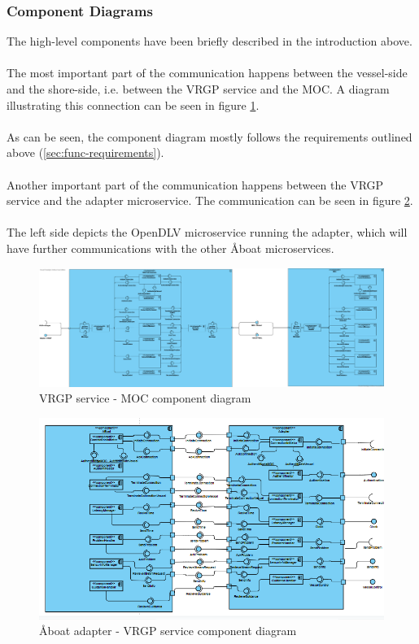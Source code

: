 \subsubsection{Component Diagrams}

The high-level components have been briefly described in the introduction above.
\\\\
The most important part of the communication happens between the vessel-side and the shore-side, i.e. between the VRGP service and the MOC. A diagram illustrating this connection can be seen in figure \ref{fig:vrgp-moc-component-diagram}.
\\\\
As can be seen, the component diagram mostly follows the requirements outlined above (\ref{sec:func-requirements}).
\\\\
Another important part of the communication happens between the VRGP service and the adapter microservice. The communication can be seen in figure \ref{fig:adapter-vrgp-component-diagram}.
\\\\
The left side depicts the OpenDLV microservice running the adapter, which will have further communications with the other Åboat microservices.

\begin{figure}[h!]
	\centering
	\includegraphics[width=\linewidth]{diagrams/ComponentDiagram_GenericVrgpMicroservice_HandlerView}
	\caption{VRGP service - MOC component diagram}
	\label{fig:vrgp-moc-component-diagram}
\end{figure}

\begin{figure}[h!]
	\centering
	\includegraphics[width=\linewidth]{diagrams/components_adapter}
	\caption{Åboat adapter - VRGP service component diagram}
	\label{fig:adapter-vrgp-component-diagram}
\end{figure}

